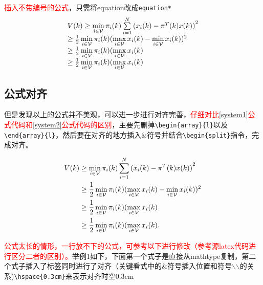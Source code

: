 \textcolor{red}{插入不带编号的公式}，只需将equation改成\verb+equation*+
\begin{equation*}
  \begin{array}{l}
V(k) \ge \mathop {\min }\limits_{i \in {\cal V}} {\pi _i}(k)\sum\limits_{i = 1}^N {{{({x_i}(k) - {\pi ^T}(k)x(k))}^2}} \\
 \ge \frac{1}{2}\mathop {\min }\limits_{i \in {\cal V}} {\pi _i}(k){(\mathop {\max }\limits_{i \in {\cal V}} {x_i}(k) - \mathop {\min }\limits_{i \in {\cal V}} {x_i}(k))^2}\\
 \ge \frac{1}{2}\mathop {\min }\limits_{i \in {\cal V}} {\pi _i}(k)(\mathop {\max }\limits_{i \in {\cal V}} {x_i}(k)\\
 \ge \frac{1}{2}\mathop {\min }\limits_{i \in {\cal V}} {\pi _i}(k)(\mathop {\max }\limits_{i \in {\cal V}} {x_i}(k)
\end{array}
\end{equation*}


\subsection{公式对齐}

但是发现以上的公式并不美观，可以进一步进行对齐完善，\textcolor{red}{仔细对比\eqref{system1}公式代码和\eqref{system2}公式代码的区别}，主要先删掉\verb+\begin{array}{l}+以及\verb+\end{array}{l}+，然后要在对齐的地方插入$\&$符号并结合\verb+\begin{split}+指令，完成对齐。

\begin{equation}\label{system2}
\begin{split}
V(k) &\ge \mathop {\min }\limits_{i \in {\cal V}} {\pi _i}(k)\sum\limits_{i = 1}^N {{{({x_i}(k) - {\pi ^T}(k)x(k))}^2}} \\
 &\ge \frac{1}{2}\mathop {\min }\limits_{i \in {\cal V}} {\pi _i}(k){(\mathop {\max }\limits_{i \in {\cal V}} {x_i}(k) - \mathop {\min }\limits_{i \in {\cal V}} {x_i}(k))^2}\\
 &\ge \frac{1}{2}\mathop {\min }\limits_{i \in {\cal V}} {\pi _i}(k)(\mathop {\max }\limits_{i \in {\cal V}} {x_i}(k)\\
 &\ge \frac{1}{2}\mathop {\min }\limits_{i \in {\cal V}} {\pi _i}(k)(\mathop {\max }\limits_{i \in {\cal V}} {x_i}(k).
\end{split}
\end{equation}

\textcolor{red}{公式太长的情形，一行放不下的公式，可参考以下进行修改（参考源latex代码进行区分二者的区别）。}举例1如下，下面第一个式子是直接从mathtype复制，第二个式子插入了标签同时进行了对齐（关键看式中的\&符号插入位置和符号$\backslash$$\backslash$的关系)\verb+\hspace{0.3cm}+来表示对齐时空0.3cm



